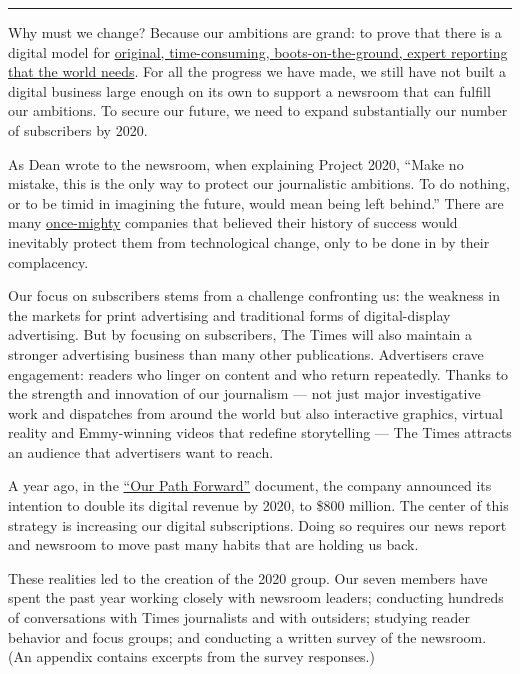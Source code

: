 \begin{center}\rule{0.5\linewidth}{\linethickness}\end{center}

Why must we change? Because our ambitions are grand: to prove that there
is a digital model for
\href{https://www.nytimes.com/video/multimedia/100000003957700/the-times-celebrates-a-milestone.html}{original,
time-consuming, boots-on-the-ground, expert reporting that the world
needs}. For all the progress we have made, we still have not built a
digital business large enough on its own to support a newsroom that can
fulfill our ambitions. To secure our future, we need to expand
substantially our number of subscribers by 2020.

As Dean wrote to the newsroom, when explaining Project 2020, ``Make no
mistake, this is the only way to protect our journalistic ambitions. To
do nothing, or to be timid in imagining the future, would mean being
left behind.'' There are many
\href{https://www.nytimes.com/interactive/business/kodak-timeline.html}{once-mighty}
companies that believed their history of success would inevitably
protect them from technological change, only to be done in by their
complacency.

Our focus on subscribers stems from a challenge confronting us: the
weakness in the markets for print advertising and traditional forms of
digital-display advertising. But by focusing on subscribers, The Times
will also maintain a stronger advertising business than many other
publications. Advertisers crave engagement: readers who linger on
content and who return repeatedly. Thanks to the strength and innovation
of our journalism --- not just major investigative work and dispatches
from around the world but also interactive graphics, virtual reality and
Emmy-winning videos that redefine storytelling --- The Times attracts an
audience that advertisers want to reach.

A year ago, in the
\href{http://www.nytco.com/wp-content/uploads/Our-Path-Forward.pdf}{``Our
Path Forward''} document, the company announced its intention to double
its digital revenue by 2020, to \$800 million. The center of this
strategy is increasing our digital subscriptions. Doing so requires our
news report and newsroom to move past many habits that are holding us
back.

These realities led to the creation of the 2020 group. Our seven members
have spent the past year working closely with newsroom leaders;
conducting hundreds of conversations with Times journalists and with
outsiders; studying reader behavior and focus groups; and conducting a
written survey of the newsroom. (An appendix contains excerpts from the
survey responses.)

